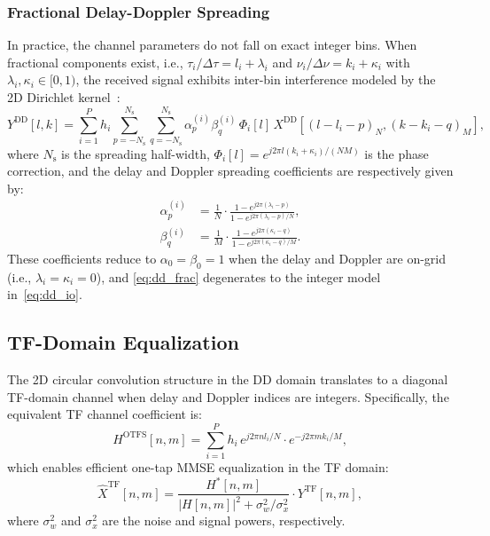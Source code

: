 \subsubsection{Fractional Delay-Doppler Spreading}
In practice, the channel parameters do not fall on exact integer bins. When fractional components exist, i.e., $\tau_i / \Delta\tau = l_i + \lambda_i$ and $\nu_i / \Delta\nu = k_i + \kappa_i$ with $\lambda_i, \kappa_i \in [0, 1)$, the received signal exhibits inter-bin interference modeled by the 2D Dirichlet kernel~\cite{raviteja2019}:
\begin{equation}\label{eq:dd_frac}
  Y^{\mathrm{DD}}[l,k] = \sum_{i=1}^{P} h_i \!\!\sum_{p=-N_{\mathrm{s}}}^{N_{\mathrm{s}}} \sum_{q=-N_{\mathrm{s}}}^{N_{\mathrm{s}}} \alpha_p^{(i)} \beta_q^{(i)}\, \Phi_i[l]\, X^{\mathrm{DD}}\!\left[(l\!-\!l_i\!-\!p)_N, (k\!-\!k_i\!-\!q)_M\right],
\end{equation}
where $N_{\mathrm{s}}$ is the spreading half-width, $\Phi_i[l] = e^{j2\pi l(k_i + \kappa_i)/(NM)}$ is the phase correction, and the delay and Doppler spreading coefficients are respectively given by:
\begin{align}
  \alpha_p^{(i)} &= \frac{1}{N} \cdot \frac{1 - e^{j2\pi(\lambda_i - p)}}{1 - e^{j2\pi(\lambda_i - p)/N}}, \label{eq:alpha}\\[4pt]
  \beta_q^{(i)} &= \frac{1}{M} \cdot \frac{1 - e^{j2\pi(\kappa_i - q)}}{1 - e^{j2\pi(\kappa_i - q)/M}}. \label{eq:beta}
\end{align}
These coefficients reduce to $\alpha_0 = \beta_0 = 1$ when the delay and Doppler are on-grid (i.e., $\lambda_i = \kappa_i = 0$), and \eqref{eq:dd_frac} degenerates to the integer model in~\eqref{eq:dd_io}.

\subsection{TF-Domain Equalization}

The 2D circular convolution structure in the DD domain translates to a diagonal TF-domain channel when delay and Doppler indices are integers. Specifically, the equivalent TF channel coefficient is:
\begin{equation}\label{eq:tf_otfs}
  H^{\mathrm{OTFS}}[n,m] = \sum_{i=1}^{P} h_i\, e^{j2\pi n l_i / N} \cdot e^{-j2\pi m k_i / M},
\end{equation}
which enables efficient one-tap MMSE equalization in the TF domain:
\begin{equation}\label{eq:mmse}
  \hat{X}^{\mathrm{TF}}[n,m] = \frac{H^{*}[n,m]}{|H[n,m]|^2 + \sigma_w^2 / \sigma_x^2} \cdot Y^{\mathrm{TF}}[n,m],
\end{equation}
where $\sigma_w^2$ and $\sigma_x^2$ are the noise and signal powers, respectively.

